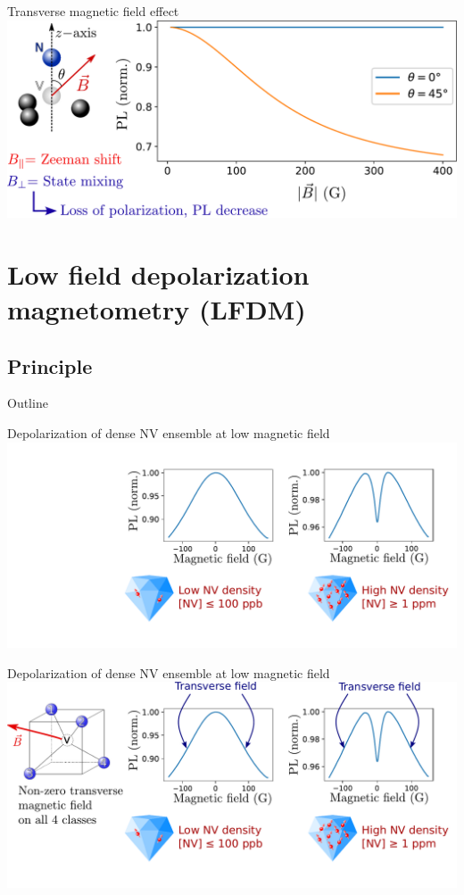 \documentclass{beamer}
\begin{document}
\begin{frame}{Transverse magnetic field effect}
\centering
\includegraphics[width=\textwidth,height=0.85\textheight,keepaspectratio]{Slide_champs_transverse_allege}
\end{frame}



\section{Low field depolarization magnetometry (LFDM)}
\subsection{Principle}
\begin{frame}{Outline}
\tableofcontents[currentsection]
\end{frame}

\begin{frame}{Depolarization of dense NV ensemble at low magnetic field}
\centering
\includegraphics[width=\textwidth,height=0.85\textheight,keepaspectratio]{slide_low_field_depolarization_f_-3}
\end{frame}

\begin{frame}{Depolarization of dense NV ensemble at low magnetic field}
\centering
\includegraphics[width=\textwidth,height=0.85\textheight,keepaspectratio]{slide_low_field_depolarization_f_-2}
\end{frame}
\end{document}
